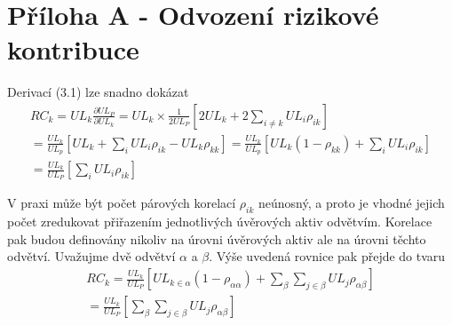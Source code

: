 \section{Příloha A - Odvození rizikové kontribuce}

Derivací (3.1) lze snadno dokázat
\begin{multline*}
RC_k = UL_k \frac{\partial UL_P}{\partial UL_k} = UL_k \times \frac{1}{2 UL_P}\left[2UL_k + 2\sum_{i \neq k}UL_i \rho_{ik}\right]\\
= \frac{UL_k}{UL_p}\left[UL_k + \sum_i UL_i \rho_{ik} - UL_k \rho_{kk} \right] = \frac{UL_k}{UL_p}\left[UL_k(1 - \rho_{kk}) + \sum_i UL_i \rho_{ik} \right]\\
= \frac{UL_k}{UL_P}\left[\sum_i UL_i \rho_{ik} \right]
\end{multline*}

V praxi může být počet párových korelací $\rho_{ik}$ neúnosný, a proto je vhodné jejich počet zredukovat přiřazením jednotlivých úvěrových aktiv odvětvím. Korelace pak budou definovány nikoliv na úrovni úvěrových aktiv ale na úrovni těchto odvětví. Uvažujme dvě odvětví $\alpha$ a $\beta$. Výše uvedená rovnice pak přejde do tvaru
\begin{multline*}
RC_k = \frac{UL_k}{UL_P}\left[UL_{k \in \alpha}(1 - \rho_{\alpha \alpha}) + \sum_{\beta} \sum_{j \in \beta}UL_j \rho_{\alpha \beta} \right]\\
= \frac{UL_k}{UL_P}\left[\sum_{\beta} \sum_{j \in \beta} UL_j \rho_{\alpha \beta} \right]
\end{multline*}

